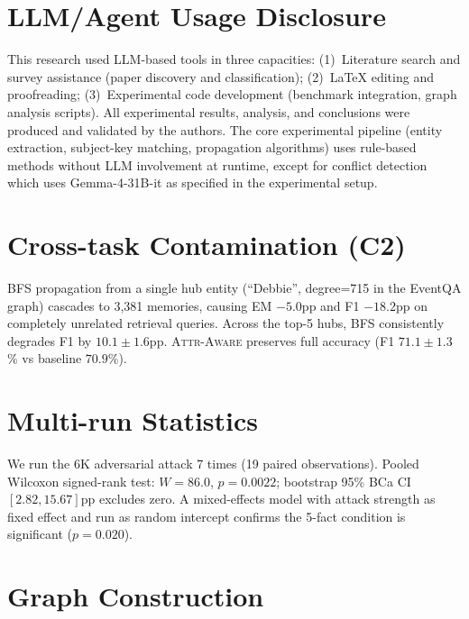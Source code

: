 \documentclass{article}
\newcommand{\attraware}{\textsc{Attr-Aware}}
\begin{document}
\section*{LLM/Agent Usage Disclosure}

This research used LLM-based tools in three capacities:
(1)~Literature search and survey assistance (paper discovery and classification);
(2)~LaTeX editing and proofreading;
(3)~Experimental code development (benchmark integration, graph analysis scripts).
All experimental results, analysis, and conclusions were produced and validated by the authors.
The core experimental pipeline (entity extraction, subject-key matching, propagation algorithms) uses rule-based methods without LLM involvement at runtime, except for conflict detection which uses Gemma-4-31B-it as specified in the experimental setup.






\appendix

\section{Cross-task Contamination (C2)}
\label{app:cross_task}

BFS propagation from a single hub entity (``Debbie'', degree=715 in the EventQA graph) cascades to 3,381 memories, causing EM $-5.0$pp and F1 $-18.2$pp on completely unrelated retrieval queries.
Across the top-5 hubs, BFS consistently degrades F1 by $10.1\pm1.6$pp.
\attraware{} preserves full accuracy (F1 $71.1\pm1.3$\% vs baseline $70.9$\%).

\section{Multi-run Statistics}
\label{app:stats}

We run the 6K adversarial attack 7 times (19 paired observations).
Pooled Wilcoxon signed-rank test: $W = 86.0$, $p = 0.0022$; bootstrap 95\% BCa CI $[2.82, 15.67]$pp excludes zero.
A mixed-effects model with attack strength as fixed effect and run as random intercept confirms the 5-fact condition is significant ($p = 0.020$).

\section{Graph Construction}
\label{app:graph}
\end{document}
